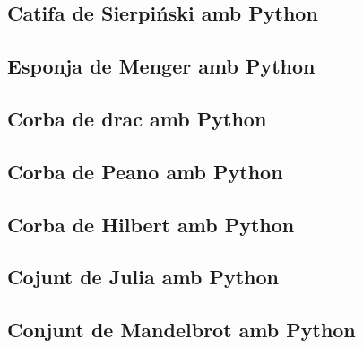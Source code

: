 \documentclass[12pt,a4paper]{report}
\begin{document}
{
}

\subsection{Catifa de Sierpiński amb Python}

{
}

\subsection{Esponja de Menger amb Python}

{
}

\subsection{Corba de drac amb Python}

{
}

\subsection{Corba de Peano amb Python}

{
}

\subsection{Corba de Hilbert amb Python}

{
}

\subsection{Cojunt de Julia amb Python}

{
}

\subsection{Conjunt de Mandelbrot amb Python}

{
}
\end{document}
